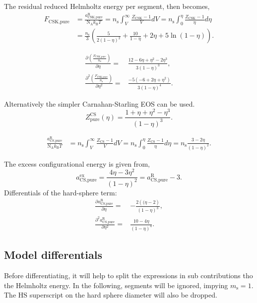 \documentclass[english]{../thermomemo/thermomemo}
\newcommand*{\pd}[3][]{\frac{\partial^{#1}#2}{\partial{#3}^{#1}}}%
\newcommand*{\lb}{\left(}
\newcommand*{\rb}{\right)}
\newcommand{\hs}{\text{HS}\xspace}
\newcommand{\seg}{\ensuremath{\text{s}}\xspace}
\newcommand{\pure}{\ensuremath{\text{pure}}\xspace}
\newcommand{\kB}{\ensuremath{k_{\text{B}}}\xspace}
\newcommand{\NA}{\ensuremath{\text{N}_{\text{A}}}\xspace}
\newcommand{\res}{\ensuremath{\text{R}}\xspace}
\newcommand{\CSK}{\ensuremath{\text{CSK}}\xspace}
\newcommand{\CS}{\ensuremath{\text{CS}}\xspace}
\newcommand{\excess}{\ensuremath{\text{ex}}\xspace}
\begin{document}
The residual reduced Helmholtz energy per segment, then becomes,
\begin{align}
  \label{eq:a_csk}
  F_{\CSK,\pure} &= \frac{a_{\CSK,\pure}^\res}{\NA \kB T}  = n_\seg \int_V^\infty \frac{Z_\CSK - 1}{V} dV = n_\seg \int_0^\eta \frac{Z_\CSK - 1}{\eta} d \eta  \nonumber \\&=  \frac{n_\seg}{3}\lb \frac{5}{2 (1 - \eta)^2} + \frac{10}{1 - \eta} + 2 \eta  + 5 \ln\lb 1 - \eta\rb\rb.
\end{align}

\begin{align}
  \label{eq:a_hs_diff_csk}
  \pd{\lb\frac{F_{\CSK,\pure}}{n_\seg}\rb}{\eta} =& \frac{12 - 6 \eta + \eta^2 - 2 \eta^3}{3\lb 1-\eta\rb^3},\\
  \pd[2]{\lb\frac{F_{\CSK,\pure}}{n_\seg}\rb}{\eta} =& \frac{-5 \lb-6 + 2 \eta + \eta^2\rb}{3 \lb 1-\eta\rb^4}.
\end{align}

Alternatively the simpler Carnahan-Starling \cite{Carnahan1969} EOS can be used.
\begin{equation}
  \label{eq:z_hs_cs}
  Z_\pure^\CS \lb \eta \rb = \frac{ 1 + \eta + \eta^2 - \eta^3}{\lb 1-\eta\rb^3}.
\end{equation}

\begin{align}
  \label{eq:a_cs}
  \frac{a_{\CS,\pure}^\res}{\NA \kB T}  &= n_\seg \int_V^\infty \frac{Z_\CS - 1}{V} dV = n_\seg \int_0^\eta \frac{Z_\CS - 1}{\eta} d \eta =  n_\seg \frac{3-2\eta}{\lb 1- \eta \rb^2}.
\end{align}

The excess configurational energy is given from,
\begin{equation}
  \label{eq:a_hs_2}
  a_{\CS,\pure}^\excess = \frac{4 \eta - 3 \eta^2}{\lb 1-\eta\rb^2} = a_{\CS,\pure}^\res - 3.
\end{equation}
Differentials of the hard-sphere term:
\begin{align}
  \label{eq:a_hs_diff_2}
  \pd{a_{\CS,\pure}^\res}{\eta} =& -\frac{2 \lb( \eta - 2\rb}{\lb 1-\eta\rb^3},\\
  \pd[2]{a_{\CS,\pure}^\res}{\eta} =& \frac{10 - 4 \eta}{\lb 1-\eta\rb^4}.
\end{align}

\subsection{Model differentials}
Before differentiating, it will help to split the expressions in sub
contributions tho the Helmholtz energy. In the following, segments will
be ignored, impying $m_\seg = 1$. The $\hs$ superscript on the hard
sphere diameter will also be dropped.
\end{document}
